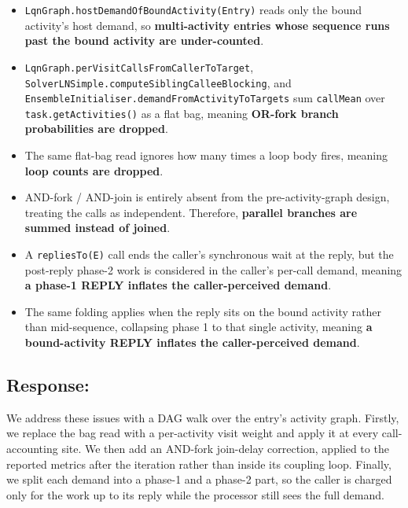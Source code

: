 \begingroup
\setlength{\itemsep}{0pt}
\setlength{\parskip}{0pt}
\setlength{\parsep}{0pt}
\setlength{\topsep}{1pt}
\begin{itemize}
\item \texttt{LqnGraph.hostDemandOfBoundActivity(Entry)} reads only the bound activity's host demand, so \textbf{multi-activity entries whose sequence runs past the bound activity are under-counted}.
 
\item \texttt{LqnGraph.perVisitCallsFromCallerToTarget}, \texttt{SolverLNSimple.computeSiblingCalleeBlocking}, and \texttt{EnsembleInitialiser.demandFromActivityToTargets} sum \texttt{callMean} over \texttt{task.getActivities()} as a flat bag, meaning \textbf{OR-fork branch probabilities are dropped}.

\item The same flat-bag read ignores how many times a loop body fires, meaning \textbf{loop counts are dropped}.

\item AND-fork / AND-join is entirely absent from the pre-activity-graph design, treating the calls as independent. Therefore, \textbf{parallel branches are summed instead of joined}.

\item A \texttt{repliesTo(E)} call ends the caller's synchronous wait at the reply, but the post-reply phase-2 work is considered in the caller's per-call demand, meaning \textbf{a phase-1 REPLY inflates the caller-perceived demand}.

\item The same folding applies when the reply sits on the bound activity rather than mid-sequence, collapsing phase 1 to that single activity, meaning \textbf{a bound-activity REPLY inflates the caller-perceived demand}.
\end{itemize}
\endgroup

\subsection{Response:}

We address these issues with a DAG walk over the entry's activity graph. Firstly, we replace the bag read with a per-activity visit weight and apply it at every call-accounting site. We then add an AND-fork join-delay correction, applied to the reported metrics after the iteration rather than inside its coupling loop. Finally, we split each demand into a phase-1 and a phase-2 part, so the caller is charged only for the work up to its reply while the processor still sees the full demand.

